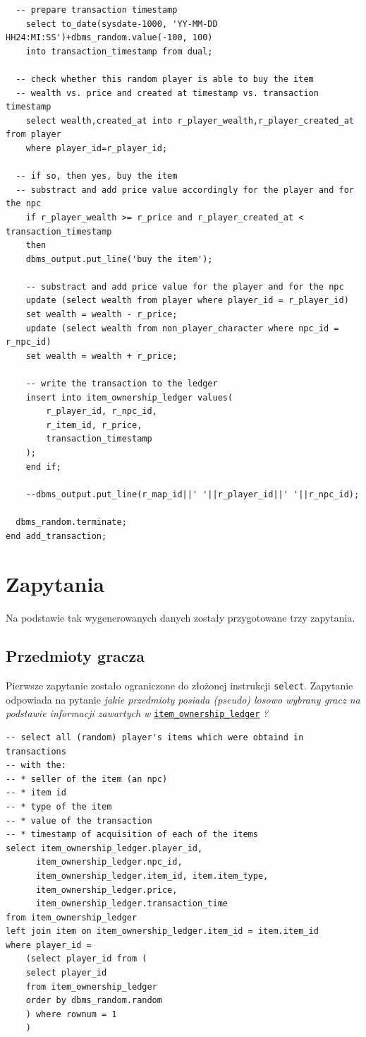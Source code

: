 \documentclass[11pt]{article}
\begin{document}
\begin{verbatim}
  -- prepare transaction timestamp
    select to_date(sysdate-1000, 'YY-MM-DD HH24:MI:SS')+dbms_random.value(-100, 100)
    into transaction_timestamp from dual;

  -- check whether this random player is able to buy the item
  -- wealth vs. price and created at timestamp vs. transaction timestamp
    select wealth,created_at into r_player_wealth,r_player_created_at from player
    where player_id=r_player_id;

  -- if so, then yes, buy the item
  -- substract and add price value accordingly for the player and for the npc
    if r_player_wealth >= r_price and r_player_created_at < transaction_timestamp
    then
	dbms_output.put_line('buy the item');

	-- substract and add price value for the player and for the npc
	update (select wealth from player where player_id = r_player_id)
	set wealth = wealth - r_price;
	update (select wealth from non_player_character where npc_id = r_npc_id)
	set wealth = wealth + r_price;

	-- write the transaction to the ledger
	insert into item_ownership_ledger values(
	    r_player_id, r_npc_id,
	    r_item_id, r_price,
	    transaction_timestamp
	);
    end if;

    --dbms_output.put_line(r_map_id||' '||r_player_id||' '||r_npc_id);

  dbms_random.terminate;
end add_transaction;
\end{verbatim}

\section{Zapytania}
\label{sec:org1d59316}
Na podstawie tak wygenerowanych danych zostały przygotowane trzy zapytania.

\subsection{Przedmioty gracza}
\label{sec:orgf2829a3}
Pierwsze zapytanie zostało ograniczone do złożonej instrukcji \texttt{select}.
Zapytanie odpowiada na pytanie \emph{jakie przedmioty posiada (pseudo) losowo wybrany gracz
na podstawie informacji zawartych w} \hyperref[sec:org340c0bf]{\texttt{item\_ownership\_ledger}} \emph{?}
\begin{verbatim}
-- select all (random) player's items which were obtaind in transactions
-- with the:
-- * seller of the item (an npc)
-- * item id
-- * type of the item
-- * value of the transaction
-- * timestamp of acquisition of each of the items
select item_ownership_ledger.player_id,
      item_ownership_ledger.npc_id,
      item_ownership_ledger.item_id, item.item_type,
      item_ownership_ledger.price,
      item_ownership_ledger.transaction_time
from item_ownership_ledger
left join item on item_ownership_ledger.item_id = item.item_id
where player_id =
    (select player_id from (
	select player_id
	from item_ownership_ledger
	order by dbms_random.random
	) where rownum = 1
    )
\end{verbatim}
\end{document}
